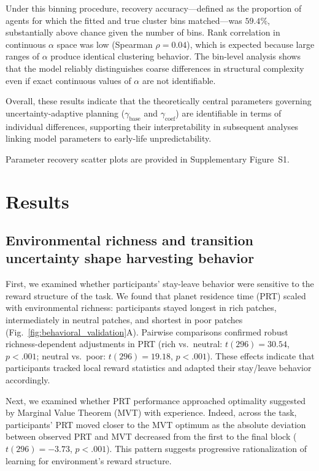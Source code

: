 \documentclass[12pt]{article}
\begin{document}
Under this binning procedure, recovery accuracy—defined as the proportion of agents for which the fitted and true cluster bins matched—was \(59.4\%\), substantially above chance given the number of bins. Rank correlation in continuous \(\alpha\) space was low (Spearman \(\rho = 0.04\)), which is expected because large ranges of \(\alpha\) produce identical clustering behavior. The bin-level analysis shows that the model reliably distinguishes coarse differences in structural complexity even if exact continuous values of \(\alpha\) are not identifiable.

Overall, these results indicate that the theoretically central parameters governing uncertainty-adaptive planning (\(\gamma_{\text{base}}\) and \(\gamma_{\text{coef}}\)) are identifiable in terms of individual differences, supporting their interpretability in subsequent analyses linking model parameters to early-life unpredictability.

Parameter recovery scatter plots are provided in Supplementary Figure~S1.

\FloatBarrier

\section*{Results}

\subsection{Environmental richness and transition uncertainty shape harvesting behavior}

First, we examined whether participants' stay-leave behavior were sensitive to the reward structure of the task. We found that planet residence time (PRT) scaled with environmental richness: participants stayed longest in rich patches, intermediately in neutral patches, and shortest in poor patches (Fig.~\ref{fig:behavioral_validation}A). Pairwise comparisons confirmed robust richness-dependent adjustments in PRT (rich vs.\ neutral: $t(296)=30.54$, $p<.001$; neutral vs.\ poor: $t(296)=19.18$, $p<.001$). These effects indicate that participants tracked local reward statistics and adapted their stay/leave behavior accordingly.

Next, we examined whether PRT performance approached optimality suggested by Marginal Value Theorem (MVT) with experience. Indeed, across the task, participants' PRT moved closer to the MVT optimum as the absolute deviation between observed PRT and MVT decreased from the first to the final block ($t(296)=-3.73$, $p<.001$). This pattern suggests progressive rationalization of learning for environment's reward structure.
\end{document}
